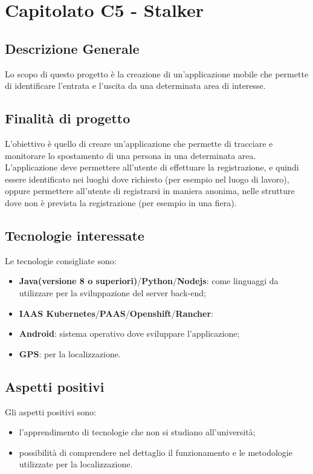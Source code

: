 \section{Capitolato C5 - Stalker}
\subsection{Descrizione Generale}
Lo scopo di questo progetto è la creazione di un'applicazione mobile che permette di identificare l'entrata e l'uscita da una determinata area di interesse.
\subsection{Finalità di progetto}%
L'obiettivo è quello di creare un'applicazione che permette di tracciare e monitorare lo spostamento di una persona in una determinata area. L'applicazione deve permettere all'utente di effettuare la registrazione, e quindi essere identificato nei luoghi dove richiesto (per esempio nel luogo di lavoro), oppure permettere all'utente di registrarsi in maniera anonima, nelle strutture dove non è prevista la registrazione (per esempio in una fiera).
\subsection{Tecnologie interessate}
Le tecnologie consigliate sono:
\begin{itemize} %
	\item \textbf{Java\glo(versione 8 o superiori)}/\textbf{Python\glo}/\textbf{Nodejs\glo}: come linguaggi da utilizzare per la sviluppazione del server back-end;
	\item \textbf{IAAS Kubernetes\glo}/\textbf{PAAS\glo}/\textbf{Openshift\glo}/\textbf{Rancher\glo}:
	\item \textbf{Android\glo}: sistema operativo dove sviluppare l'applicazione;
	\item \textbf{GPS\glo}: per la localizzazione.
\end{itemize}
\subsection{Aspetti positivi}
Gli aspetti positivi sono:
\begin{itemize}
	\item l'apprendimento di tecnologie che non si studiano all'università;
	\item possibilità di comprendere nel dettaglio il funzionamento e le metodologie utilizzate per la localizzazione.
	
\end{itemize}
